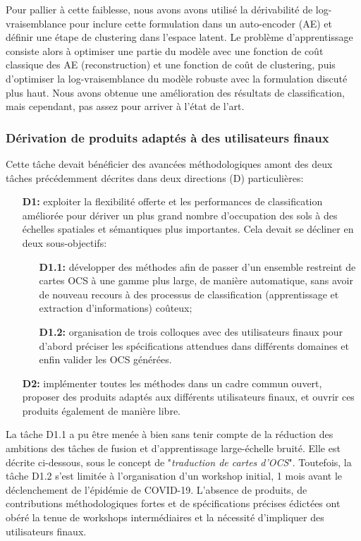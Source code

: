 Pour pallier à cette faiblesse, nous avons avons utilisé la dérivabilité de log-vraisemblance pour inclure cette formulation dans un auto-encoder (AE) et définir une étape de clustering dans l'espace latent. Le problème d'apprentissage consiste alors à optimiser une partie du modèle avec une fonction de coût classique des AE (reconstruction) et une fonction de coût de clustering, puis d'optimiser la log-vraisemblance du modèle robuste avec la formulation discuté plus haut. Nous avons obtenue une amélioration des résultats de classification, mais cependant, pas assez pour arriver à l'état de l'art.

\subsubsection{Dérivation de produits adaptés à des utilisateurs finaux}
Cette tâche devait bénéficier des avancées méthodologiques amont des deux tâches précédemment décrites dans deux directions (D) particulières:
\begin{itemize}
    \item[\textbf{D1:}] exploiter la flexibilité offerte et les performances de classification améliorée pour dériver un plus grand nombre d'occupation des sols à des échelles spatiales et sémantiques plus importantes. Cela devait se décliner en deux sous-objectifs:
    \begin{itemize}
        \item[\textbf{D1.1:}]  développer des méthodes afin de passer d'un ensemble restreint de cartes OCS à une gamme plus large, de manière automatique, sans avoir de nouveau recours à des processus de classification (apprentissage et extraction d'informations) coûteux;
        \item[\textbf{D1.2:}] organisation de trois colloques avec des utilisateurs finaux pour d'abord préciser les spécifications attendues dans différents domaines et enfin valider les OCS générées. 
    \end{itemize}
    \item[\textbf{D2:}] implémenter toutes les méthodes dans un cadre commun ouvert, proposer des produits adaptés aux différents utilisateurs finaux, et ouvrir ces produits également de manière libre.
\end{itemize}

La tâche D1.1 a pu être menée à bien sans tenir compte de la réduction des ambitions des tâches de fusion et d'apprentissage large-échelle bruité. Elle est décrite ci-dessous, sous le concept de "\emph{traduction de cartes d'OCS}". Toutefois, la tâche D1.2 s'est limitée à l'organisation d'un workshop initial, 1 mois avant le déclenchement de l'épidémie de COVID-19. L'absence de produits, de contributions méthodologiques fortes et de spécifications précises édictées ont obéré la tenue de workshops intermédiaires et la nécessité d'impliquer des utilisateurs finaux.

